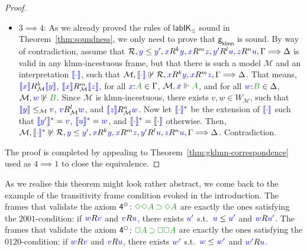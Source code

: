 \documentclass[a4paper]{article}
\theoremstyle{plain}
\theoremstyle{definition}
\newcommand*{\ax}[1]{\mathsf{#1}}
\newcommand*{\IK}{\mathsf{IK}}
\newcommand*{\labIKp}{\lab\IK_{\le}}
\newcommand*{\IMP}{\mathbin{\supset}}%
\newcommand*{\BOX}{\mathord{\Box}}
\newcommand*{\DIA}{\mathord{\Diamond}}
\newcommand{\B}{\mathcal{R}}
\newcommand{\Left}{\Gamma} %
\newcommand{\Right}{\Delta} %
\newcommand*{\fm}[1]{{\color{notgreen}{#1}}}
\newcommand*{\lb}[1]{{\color{blue}{#1}}}
\newcommand*{\rel}{R}
\newcommand*{\labels}[2]{\lb{#1}\mathord{:}\fm{#2}}
\newcommand*{\accs}[2]{\lb{#1}R\lb{#2}}
\newcommand*{\futs}[2]{\lb{#1}\le{\lb{#2}}}
\newcommand{\SEQ}{\Longrightarrow}
\newcommand*{\lab}{\mathsf{lab}}
\newcommand{\gklmn}{{\mathsf{g_{klmn}}}}%
\newcommand{\M}{\mathcal{M}}
\newcommand{\inter}[1]{\lb{\llbracket #1\rrbracket}}
\newcommand{\nforce}[3]{#1,#2\not\Vdash#3}
\newcommand{\cforce}[3]{#1,\lb{#2}\Vdash\fm{#3}}
\newcommand{\cnforce}[3]{#1,\lb{#2}\not\Vdash\fm{#3}}
\begin{document}
\begin{proof}
\begin{itemize}
		\item $3 \implies 4$:
		As we already proved the rules of $\labIKp$ sound in Theorem~\ref{thm:soundness}, we only need to prove that $\gklmn$ is sound.
		By way of contradiction, assume that $\B, \futs{y}{y'}, \lb x R^{k} \lb y, \lb x R^{m} \lb z, \lb{y'}R^{l} \lb u, \lb z R^{n} \lb u, \Left\SEQ\Right$ is valid in any klmn-incestuous frame,
		but that there is such a model $\M$ and an interpretation $\inter\cdot$, such
		that $\M,\inter\cdot\not\Vdash\B, \lb x R^{k} \lb y, \lb x R^{m} \lb z, \Left \SEQ \Right$.
		That means, $\inter x \rel_\M^k \inter y$, $\inter x \rel_\M^m\inter z$, for all $\labels{x}{A} \in \Left$, $\cforce \M xA$, and for all $\labels wB\in\Right$,
		$\cnforce \M wB$. 
		Since $\M$ is klmn-incestuous, there exists $v,w\in W_\M$, such that $\inter y \le_\M \lb{v}$, $\lb{v} R_\M^l \lb{w}$, and $\inter z R_\M^n \lb{w}$.
		Now let $\inter\cdot^*$ be the extension of $\inter\cdot$ such that $\inter{y'}^* = \lb v$, $\inter{u}^* = \lb w$, and $\inter\cdot^* = \inter\cdot$ otherwise.
		Then, $ \nforce \M {\inter\cdot^*} {\B, \futs{y}{y'}, \lb x R^{k} \lb y, \lb x R^{m} \lb z, \lb{y'}R^{l} \lb u, \lb z R^{n} \lb u, \Left\SEQ\Right}$. Contradiction.
	\end{itemize}
	
	The proof is completed by appealing to Theorem~\ref{thm:gklmn-correspondence} used as $4 \implies 1$ to close the equivalence.
\end{proof}

%

As we realise this theorem might look rather abstract, we come back to the example of the transitivity frame condition evoked in the introduction.
The frames that validate the axiom $\ax{4^{\DIA}} \colon \fm{\DIA\DIA A \IMP \DIA A}$ are exactly the ones satisfying the $2001$-condition: if $\accs wv$ and $\accs vu$, there exists $\lb{u'}$ s.t.~$\futs{u}{u'}$ and $\accs{w}{u'}$.
The frames that validate the axiom $\ax{4^{\BOX}} \colon \fm{\BOX A \IMP \BOX \BOX A}$ are exactly the ones satisfying the $0120$-condition: if $\accs wv$ and $\accs vu$, there exists $\lb{w'}$ s.t.~$\futs{w}{w'}$ and $\accs{w'}{u}$.
\end{document}
